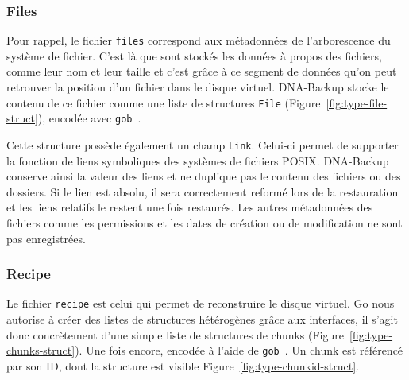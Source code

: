 \documentclass[a4paper]{report}
\begin{document}
\subsubsection{Files}
Pour rappel, le fichier \verb|files| correspond aux métadonnées
de l'arborescence du système de fichier.
C'est là que sont stockés les données à propos des fichiers, comme leur nom et leur taille
et c'est grâce à ce segment de données qu'on peut retrouver la position d'un fichier
dans le disque virtuel.
DNA-Backup stocke le contenu de ce fichier comme une liste de structures \verb|File|
(Figure~\ref{fig:type-file-struct}), encodée avec \verb|gob|~\cite{pike2011gob}.

Cette structure possède également un champ \verb|Link|.
Celui-ci permet de supporter la fonction de liens symboliques des systèmes de fichiers POSIX.
DNA-Backup conserve ainsi la valeur des liens
et ne duplique pas le contenu des fichiers ou des dossiers.
Si le lien est absolu, il sera correctement reformé lors de la restauration
et les liens relatifs le restent une fois restaurés.
Les autres métadonnées des fichiers
comme les permissions et les dates de création ou de modification
ne sont pas enregistrées.

\subsubsection{Recipe}
Le fichier \verb|recipe| est celui qui permet de reconstruire le disque virtuel.
Go nous autorise à créer des listes de structures hétérogènes grâce aux interfaces,
il s'agit donc concrètement d'une simple liste de structures de chunks (Figure~\ref{fig:type-chunks-struct}).
Une fois encore, encodée à l'aide de \verb|gob|~\cite{pike2011gob}.
Un chunk est référencé par son ID, dont la structure est visible Figure~\ref{fig:type-chunkid-struct}.
\end{document}
